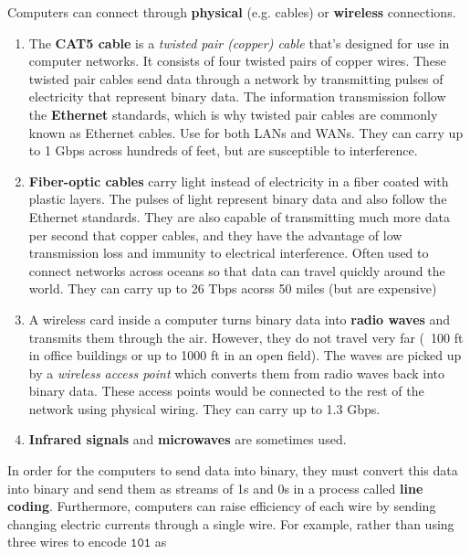 \documentclass{article}
\theoremstyle{definition}
\begin{document}
    Computers can connect through \textbf{physical} (e.g. cables) or \textbf{wireless} connections. 

    \begin{enumerate}
      \item The \textbf{CAT5 cable} is a \textit{twisted pair (copper) cable} that's designed for use in computer networks. It consists of four twisted pairs of copper wires. These twisted pair cables send data through a network by transmitting pulses of electricity that represent binary data. The information transmission follow the \textbf{Ethernet} standards, which is why twisted pair cables are commonly known as Ethernet cables. Use for both LANs and WANs. They can carry up to 1 Gbps across hundreds of feet, but are susceptible to interference. 

      \item \textbf{Fiber-optic cables} carry light instead of electricity in a fiber coated with plastic layers. The pulses of light represent binary data and also follow the Ethernet standards. They are also capable of transmitting much more data per second that copper cables, and they have the advantage of low transmission loss and immunity to electrical interference. Often used to connect networks across oceans so that data can travel quickly around the world. They can carry up to 26 Tbps acorss 50 miles (but are expensive)

      \item A wireless card inside a computer turns binary data into \textbf{radio waves} and transmits them through the air. However, they do not travel very far (~100 ft in office buildings or up to 1000 ft in an open field). The waves are picked up by a \textit{wireless access point} which converts them from radio waves back into binary data. These access points would be connected to the rest of the network using physical wiring. They can carry up to 1.3 Gbps. 

      \item \textbf{Infrared signals} and \textbf{microwaves} are sometimes used. 
    \end{enumerate}


    In order for the computers to send data into binary, they must convert this data into binary and send them as streams of 1s and 0s in a process called \textbf{line coding}. Furthermore, computers can raise efficiency of each wire by sending changing electric currents through a single wire. For example, rather than using three wires to encode $\texttt{101}$ as 
\end{document}
